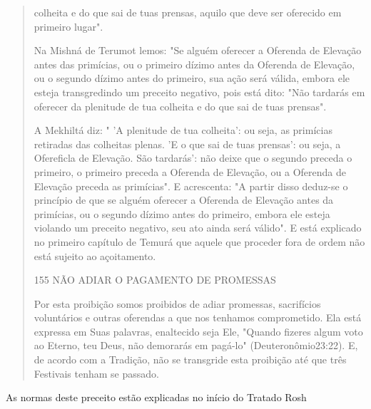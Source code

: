 \begin{quote}colheita e do que sai de tuas prensas, aquilo que deve ser oferecido em
primei­ro lugar".

Na Mishná de Terumot lemos: "Se alguém oferecer a Oferenda de Elevação
antes das primícias, ou o primeiro dízimo antes da Oferenda de
Eleva­ção, ou o segundo dízimo antes do primeiro, sua ação será válida,
embora ele esteja transgredindo um preceito negativo, pois está dito:
"Não tardarás em ofe­recer da plenitude de tua colheita e do que sai de
tuas prensas".

A Mekhiltá diz: " 'A plenitude de tua colheita': ou seja, as primícias
retiradas das colheitas plenas. 'E o que sai de tuas prensas': ou seja,
a Ofereficla de Elevação. São tardarás': não deixe que o segundo preceda
o primeiro, o primeiro preceda a Oferenda de Elevação, ou a Oferenda de
Elevação preceda as primícias". E acrescenta: "A partir disso deduz-se o
princípio de que se al­guém oferecer a Oferenda de Elevação antes da
primícias, ou o segundo dízi­mo antes do primeiro, embora ele esteja
violando um preceito negativo, seu ato ainda será válido". E está
explicado no primeiro capítulo de Temurá que aquele que proceder fora de
ordem não está sujeito ao açoitamento.

155 NÃO ADIAR O PAGAMENTO DE PROMESSAS

Por esta proibição somos proibidos de adiar promessas, sacrifícios
voluntários e outras oferendas a que nos tenhamos comprometido. Ela está
ex­pressa em Suas palavras, enaltecido seja Ele, "Quando fizeres algum
voto ao Eterno, teu Deus, não demorarás em pagá-lo" (Deuteronômio23:22).
E, de acor­do com a Tradição, não se transgride esta proibição até que
três Festivais te­nham se passado.
\end{quote}

As normas deste preceito estão explicadas no início do Tratado Rosh

